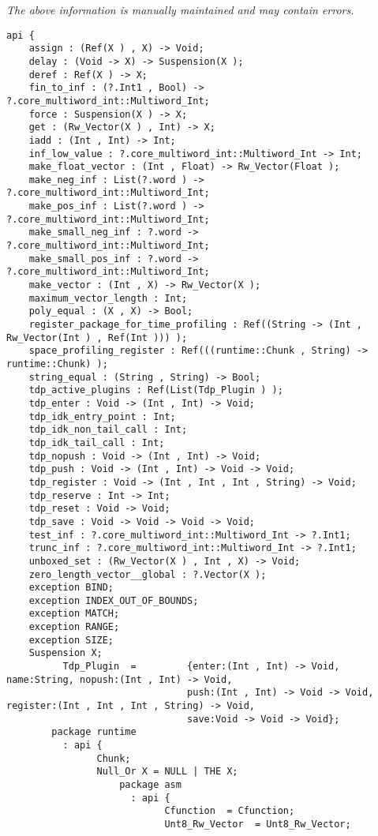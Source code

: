 \label{pkg:\_Core}

{\tiny \it The above information is manually maintained and may contain errors.}
\begin{verbatim}
api {
    assign : (Ref(X ) , X) -> Void;
    delay : (Void -> X) -> Suspension(X );
    deref : Ref(X ) -> X;
    fin_to_inf : (?.Int1 , Bool) -> ?.core_multiword_int::Multiword_Int;
    force : Suspension(X ) -> X;
    get : (Rw_Vector(X ) , Int) -> X;
    iadd : (Int , Int) -> Int;
    inf_low_value : ?.core_multiword_int::Multiword_Int -> Int;
    make_float_vector : (Int , Float) -> Rw_Vector(Float );
    make_neg_inf : List(?.word ) -> ?.core_multiword_int::Multiword_Int;
    make_pos_inf : List(?.word ) -> ?.core_multiword_int::Multiword_Int;
    make_small_neg_inf : ?.word -> ?.core_multiword_int::Multiword_Int;
    make_small_pos_inf : ?.word -> ?.core_multiword_int::Multiword_Int;
    make_vector : (Int , X) -> Rw_Vector(X );
    maximum_vector_length : Int;
    poly_equal : (X , X) -> Bool;
    register_package_for_time_profiling : Ref((String -> (Int , Rw_Vector(Int ) , Ref(Int ))) );
    space_profiling_register : Ref(((runtime::Chunk , String) -> runtime::Chunk) );
    string_equal : (String , String) -> Bool;
    tdp_active_plugins : Ref(List(Tdp_Plugin ) );
    tdp_enter : Void -> (Int , Int) -> Void;
    tdp_idk_entry_point : Int;
    tdp_idk_non_tail_call : Int;
    tdp_idk_tail_call : Int;
    tdp_nopush : Void -> (Int , Int) -> Void;
    tdp_push : Void -> (Int , Int) -> Void -> Void;
    tdp_register : Void -> (Int , Int , Int , String) -> Void;
    tdp_reserve : Int -> Int;
    tdp_reset : Void -> Void;
    tdp_save : Void -> Void -> Void -> Void;
    test_inf : ?.core_multiword_int::Multiword_Int -> ?.Int1;
    trunc_inf : ?.core_multiword_int::Multiword_Int -> ?.Int1;
    unboxed_set : (Rw_Vector(X ) , Int , X) -> Void;
    zero_length_vector__global : ?.Vector(X );
    exception BIND;
    exception INDEX_OUT_OF_BOUNDS;
    exception MATCH;
    exception RANGE;
    exception SIZE;
    Suspension X;
          Tdp_Plugin  =         {enter:(Int , Int) -> Void, name:String, nopush:(Int , Int) -> Void,
                                push:(Int , Int) -> Void -> Void, register:(Int , Int , Int , String) -> Void,
                                save:Void -> Void -> Void};
        package runtime
          : api {
                Chunk;
                Null_Or X = NULL | THE X;
                    package asm
                      : api {
                            Cfunction  = Cfunction;
                            Unt8_Rw_Vector  = Unt8_Rw_Vector;

\end{verbatim}
